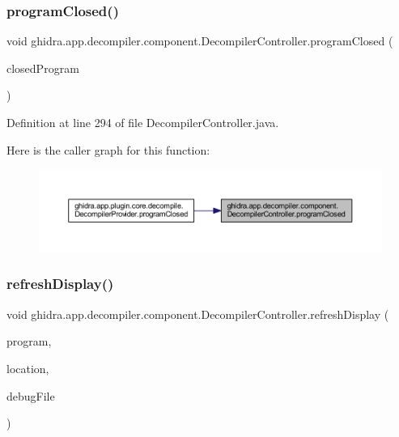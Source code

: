 \subsubsection{\texorpdfstring{programClosed()}{programClosed()}}
{\footnotesize\ttfamily void ghidra.\+app.\+decompiler.\+component.\+Decompiler\+Controller.\+program\+Closed (\begin{DoxyParamCaption}\item[{Program}]{closed\+Program }\end{DoxyParamCaption})\hspace{0.3cm}{\ttfamily [inline]}}



Definition at line 294 of file Decompiler\+Controller.\+java.

Here is the caller graph for this function\+:
\nopagebreak
\begin{figure}[H]
\begin{center}
\leavevmode
\includegraphics[width=350pt]{classghidra_1_1app_1_1decompiler_1_1component_1_1_decompiler_controller_a54c7bffb7bb2a181553cc3679315df7e_icgraph}
\end{center}
\end{figure}
\mbox{\label{classghidra_1_1app_1_1decompiler_1_1component_1_1_decompiler_controller_aacd96bcc0c2f85e8e96bde2ad5fd71d7}} 
\subsubsection{\texorpdfstring{refreshDisplay()}{refreshDisplay()}}
{\footnotesize\ttfamily void ghidra.\+app.\+decompiler.\+component.\+Decompiler\+Controller.\+refresh\+Display (\begin{DoxyParamCaption}\item[{Program}]{program,  }\item[{Program\+Location}]{location,  }\item[{File}]{debug\+File }\end{DoxyParamCaption})\hspace{0.3cm}{\ttfamily [inline]}}

